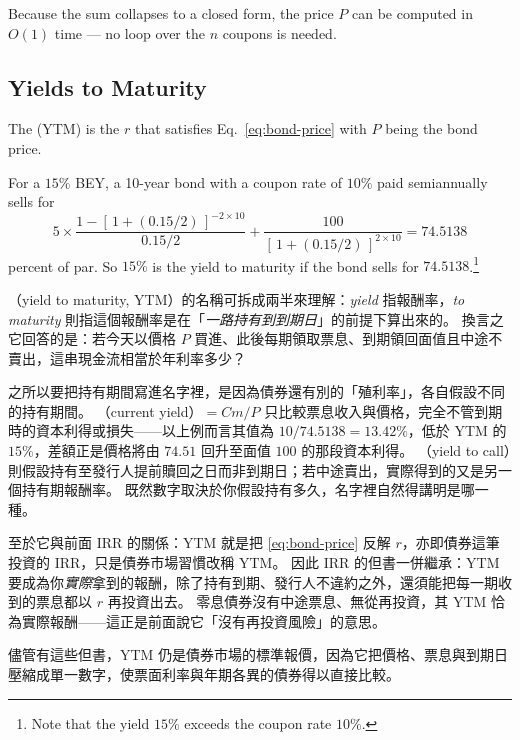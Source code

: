 \begin{note}
	Because the sum collapses to a closed form, the price $P$ can be computed in $O(1)$ time --- no loop over the $n$ coupons is needed.
\end{note}

\subsection{Yields to Maturity}

\begin{definition}
	The  (YTM) is the $r$ that satisfies Eq.~\eqref{eq:bond-price} with $P$ being the bond price.
\end{definition}

\begin{eg}
	For a $15\%$ BEY, a 10-year bond with a coupon rate of $10\%$ paid semiannually sells for
	\[
		5 \times \frac{1-[\,1+(0.15/2)\,]^{-2\times 10}}{0.15/2}
		+ \frac{100}{[\,1+(0.15/2)\,]^{2\times 10}}
		= 74.5138
	\]
	percent of par.
	So $15\%$ is the yield to maturity if the bond sells for $74.5138$.\footnote{Note that the yield $15\%$ exceeds the coupon rate $10\%$.}
\end{eg}

\suppstart
\begin{remark}
	（yield to maturity, YTM）的名稱可拆成兩半來理解：\emph{yield} 指報酬率，\emph{to maturity} 則指這個報酬率是在「\emph{一路持有到到期日}」的前提下算出來的。
	換言之它回答的是：若今天以價格 $P$ 買進、此後每期領取票息、到期領回面值且中途不賣出，這串現金流相當於年利率多少？

	之所以要把持有期間寫進名字裡，是因為債券還有別的「殖利率」，各自假設不同的持有期間。
	（current yield）$= Cm/P$ 只比較票息收入與價格，完全不管到期時的資本利得或損失——以上例而言其值為 $10/74.5138 = 13.42\%$，低於 YTM 的 $15\%$，差額正是價格將由 $74.51$ 回升至面值 $100$ 的那段資本利得。
	（yield to call）則假設持有至發行人提前贖回之日而非到期日；若中途賣出，實際得到的又是另一個持有期報酬率。
	既然數字取決於你假設持有多久，名字裡自然得講明是哪一種。

	至於它與前面 IRR 的關係：YTM 就是把 \eqref{eq:bond-price} 反解 $r$，亦即債券這筆投資的 IRR，只是債券市場習慣改稱 YTM。
	因此 IRR 的但書一併繼承：YTM 要成為你\emph{實際}拿到的報酬，除了持有到期、發行人不違約之外，還須能把每一期收到的票息都以 $r$ 再投資出去。
	零息債券沒有中途票息、無從再投資，其 YTM 恰為實際報酬——這正是前面說它「沒有再投資風險」的意思。

	儘管有這些但書，YTM 仍是債券市場的標準報價，因為它把價格、票息與到期日壓縮成單一數字，使票面利率與年期各異的債券得以直接比較。
\end{remark}
\suppend

